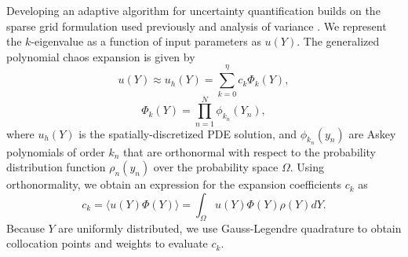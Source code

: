 \documentclass{anstrans} \usepackage{amsmath} \usepackage{amssymb}
\begin{document}
Developing an adaptive algorithm for uncertainty quantification builds on the sparse grid formulation used 
previously \cite{ans2014} and
analysis of variance \cite{Ayres}.  We represent the $k$-eigenvalue as a function of input parameters as
$u(Y)$.  The generalized polynomial chaos expansion is given by
\begin{equation}\label{approx}
  u(Y)\approx u_{h}(Y)=\sum_{k=0}^\eta c_k\Phi_k(Y),
\end{equation} 
\begin{equation} 
  \Phi_k(Y)=\prod_{n=1}^N \phi_{k_n}(Y_n), 
\end{equation} 
where $u_h(Y)$ is the
spatially-discretized PDE solution, and $\phi_{k_n}(y_n)$ are Askey polynomials of order $k_n$ that are
orthonormal with respect to the probability distribution function $\rho_n(y_n)$ over the probability space
$\Omega$.
Using orthonormality, we obtain an expression for the expansion coefficients $c_k$ as
\begin{equation}
  c_k = \langle u(Y)\Phi(Y)\rangle = \int_\Omega u(Y)\Phi(Y)\rho(Y) dY.
\end{equation}
Because $Y$ are uniformly distributed, we use Gauss-Legendre quadrature to obtain
collocation points and weights to evaluate $c_k$.  %
\end{document}
